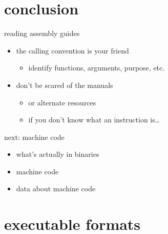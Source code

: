 
\section{conclusion}

\begin{frame}{reading assembly guides}
    \begin{itemize}
    \item the calling convention is your friend
        \begin{itemize}
        \item identify functions, arguments, purpose, etc.
        \end{itemize}
    \item don't be scared of the manuals
        \begin{itemize}
        \item or alternate resources
        \item if you don't know what an instruction is\ldots
        \end{itemize}
    \end{itemize}
\end{frame}

\begin{frame}{next: machine code}
    \begin{itemize}
    \item what's actually in binaries
    \item machine code
    \item data about machine code
    \end{itemize}
\end{frame}

\section{executable formats}

